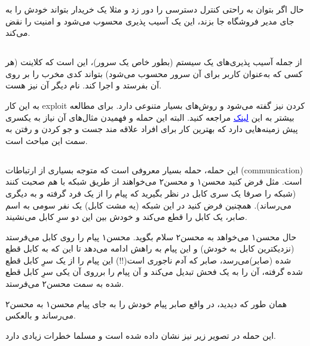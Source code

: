 \documentclass[]{article}
\begin{document}
حال اگر بتوان به راحتی کنترل دسترسی را دور زد و مثلا یک خریدار بتواند خودش را به جای مدیر فروشگاه جا بزند، این یک آسیب پذیری محسوب می‌شود و امنیت را نقض می‌کند.


\subsection*{{}}
از جمله آسیب پذیری‌های یک سیستم (‌بطور خاص یک سرور)، این است که کلاینت (هر کسی که به‌عنوان کاربر برای آن سرور محسوب می‌شود) بتواند کدی مخرب را بر روی آن بفرستد و اجرا کند. نام دیگر آن  نیز هست.



به این کار exploit کردن نیز گفته می‌شود و روش‌های بسیار متنوعی دارد. برای مطالعه بیشتر به این \href{https://owasp.org/www-community/attacks/Code_Injection}{\textcolor{blue}{\underline{لینک}}}  مراجعه کنید. البته این حمله و فهمیدن مثال‌‌های آن نیاز به یکسری پیش زمینه‌هایی دارد که بهترین کار برای افراد علاقه مند جست و جو کردن و رفتن به سمت این مباحث است. 



\subsection*{{}}
این حمله، حمله بسیار معروفی است که متوجه بسیاری از ارتباطات (‌communication) است. مثل فرض کنید محسن۱ و محسن۲  می‌خواهند از طریق شبکه با هم صحبت کنند (شبکه را صرفا یک سری کابل در نظر بگیرید که پیام را از یک فرد گرفته و به دیگری می‌رساند). همچنین فرض کنید در این شبکه (یه مشت کابل)‌ یک نفر سومی به اسم صابر، یک کابل را قطع می‌‌کند و خودش بین این دو سرِ کابل می‌نشیند.

\bigskip

حال محسن۱ می‌خواهد به محسن۲ سلام بگوید. محسن۱ پیام را روی کابل می‌فرستد (نزدیکترین کابل به خودش) و این پیام به راهش ادامه می‌دهد تا این که به کابل قطع شده (صابر)‌می‌رسد، صابر که آدم ناجوری است(!!) این پیام را از یک سرِ کابل قطع شده گرفته، آن را به یک فحش تبدیل می‌کند و آن پیام را برروی آن یکی سرِ کابل قطع شده به سمت محسن۲ می‌فرستد.

همان طور که دیدید، در واقع صابر پیام خودش را به جای پیام محسن۱ به محسن۲ می‌رساند و بالعکس.

\bigskip
این حمله در تصویر زیر نیز نشان داده شده است و مسلما خطرات زیادی دارد.
\end{document}

